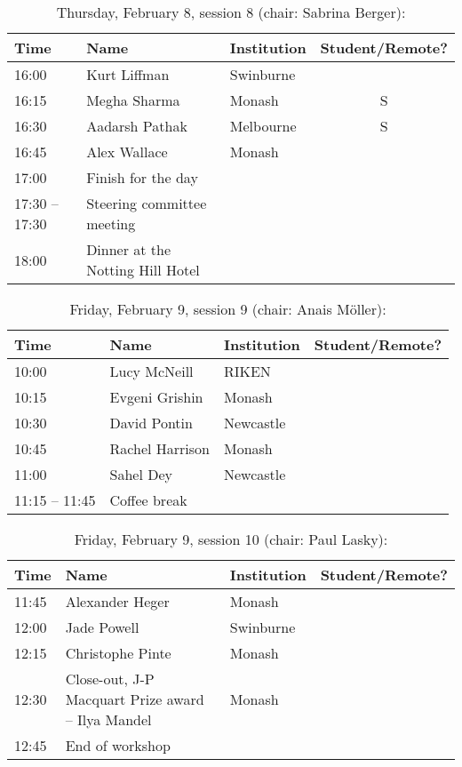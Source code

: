 \documentclass[amsmath,onecolumn]{revtex4-1}
\begin{document}
\begin{table}[!htbp]
	\centering
	\caption{Thursday, February 8, session 8 (chair: Sabrina Berger):}
\begin{tabular}{| l | l | l | c |}
	\hline
	Time & Name  & Institution & Student/Remote? \\ 		
	\hline
	16:00 & Kurt	Liffman & Swinburne & \\
	16:15 & Megha	Sharma & Monash & S \\
	16:30 & Aadarsh	Pathak & Melbourne & S \\ 
	16:45 & Alex	Wallace & Monash& \\
	\hline
	17:00 & Finish for the day & & \\
	\hline
	17:30 -- 17:30 & Steering committee meeting & & \\
	18:00 & Dinner at the Notting Hill Hotel & & \\
	\hline
\end{tabular}
\end{table}

\begin{table}[!htbp]
	\centering
	\caption{Friday, February 9, session 9 (chair: Anais M\"{o}ller):}
\begin{tabular}{| l | l | l | c |}
	\hline
	Time & Name  & Institution & Student/Remote? \\ 		
	\hline
	10:00 &Lucy	McNeill & RIKEN & \\
	10:15 & Evgeni	Grishin & Monash & \\
	10:30 & David	Pontin & Newcastle & \\
	10:45 & Rachel Harrison & Monash & \\
	11:00 & Sahel	Dey & Newcastle & \\
	\hline
	11:15 -- 11:45 & Coffee break & & \\
	\hline
\end{tabular}
\end{table}

\begin{table}[!htbp]
	\centering
	\caption{Friday, February 9, session 10 (chair: Paul Lasky):}
\begin{tabular}{| l | l | l | c |}
	\hline
	Time & Name  & Institution & Student/Remote? \\ 		
	\hline
	11:45 & Alexander	Heger & Monash & \\
	12:00 &  Jade	Powell & Swinburne & \\
	12:15 & Christophe 	Pinte & Monash & \\
	12:30 & Close-out, J-P Macquart Prize award -- Ilya Mandel & Monash & \\
	\hline
	12:45 & End of workshop & & \\
	\hline
\end{tabular}
\end{table}
\end{document}
